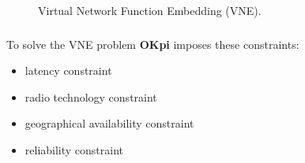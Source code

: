 \documentclass[aspectratio=169]{beamer}
\begin{document}
\begin{frame}
\begin{figure}
        \caption{Virtual Network Function Embedding (VNE).}
    \end{figure}
\end{frame}


\begin{frame}
    \frametitle{\secname}
    \framesubtitle{\subsecname}
    To solve the VNE problem \textbf{OKpi} imposes these constraints:
    \begin{itemize}
        \item latency constraint
        \item radio technology constraint
        \item geographical availability constraint
        \item reliability constraint
    \end{itemize}
\end{frame}
\end{document}
